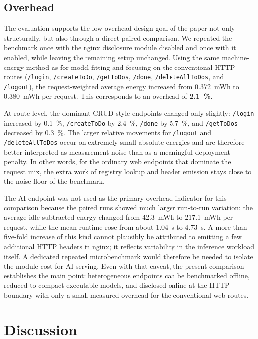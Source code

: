 \subsection{Overhead}
The evaluation supports the low-overhead design goal of the paper not only structurally, but also through a direct paired comparison. We repeated the benchmark once with the nginx disclosure module disabled and once with it enabled, while leaving the remaining setup unchanged. Using the same machine-energy method as for model fitting and focusing on the conventional HTTP routes (\texttt{/login}, \texttt{/createToDo}, \texttt{/getToDos}, \texttt{/done}, \texttt{/deleteAllToDos}, and \texttt{/logout}), the request-weighted average energy increased from \SI{0.372}{mWh} to \SI{0.380}{mWh} per request. This corresponds to an overhead of \textbf{\SI{2.1}{\percent}}.

At route level, the dominant CRUD-style endpoints changed only slightly: \texttt{/login} increased by \SI{0.1}{\percent}, \texttt{/createToDo} by \SI{2.4}{\percent}, \texttt{/done} by \SI{5.7}{\percent}, and \texttt{/getToDos} decreased by \SI{0.3}{\percent}. The larger relative movements for \texttt{/logout} and \texttt{/deleteAllToDos} occur on extremely small absolute energies and are therefore better interpreted as measurement noise than as a meaningful deployment penalty. In other words, for the ordinary web endpoints that dominate the request mix, the extra work of registry lookup and header emission stays close to the noise floor of the benchmark.

The AI endpoint was not used as the primary overhead indicator for this comparison because the paired runs showed much larger run-to-run variation: the average idle-subtracted energy changed from \SI{42.3}{mWh} to \SI{217.1}{mWh} per request, while the mean runtime rose from about \SI{1.04}{s} to \SI{4.73}{s}. A more than five-fold increase of this kind cannot plausibly be attributed to emitting a few additional HTTP headers in nginx; it reflects variability in the inference workload itself. A dedicated repeated microbenchmark would therefore be needed to isolate the module cost for AI serving. Even with that caveat, the present comparison establishes the main point: heterogeneous endpoints can be benchmarked offline, reduced to compact executable models, and disclosed online at the HTTP boundary with only a small measured overhead for the conventional web routes.

\section{Discussion}

